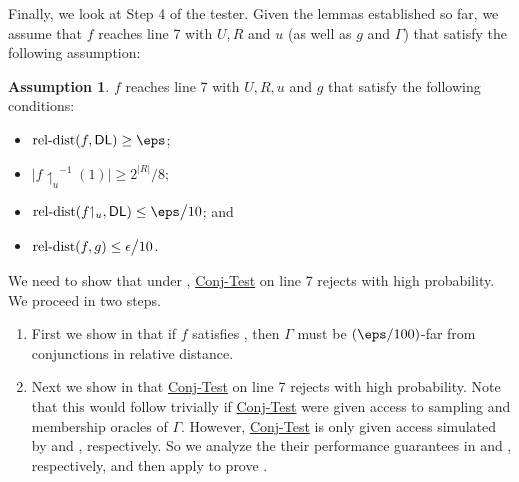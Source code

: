 \documentclass[11pt]{article}
\theoremstyle{definition}
\newtheorem{assumption}{Assumption}
\begin{document}
Finally, we look at Step 4 of the tester. 
Given the lemmas established so far, we assume that $f$ reaches line 7 with $U,R$ and $u$ (as well as $g$ and $\Gamma$) that satisfy the following assumption:

\begin{assumption}\label{assumption: fu dense + close to g}
$f$ reaches line 7 with $U,R,u$ and $g$ that satisfy the following conditions:
    \begin{itemize}
    \item $\reldist(f,\textsf{DL})\ge \eps$;
        \item $\big|f{\upharpoonleft_{ u}}^{-1}(1)\big| \geq 2^{| R|}\big/8 $;
        \item $\reldist(f{\upharpoonleft_{u}},\textsf{DL})\le \eps\big/10 $; and
        \item $\mathrm{rel}\text{-}\mathrm{dist}(f, g)\leq \epsilon\big/10$.
\end{itemize}
\end{assumption}

We need to show that under , 
\hyperlink{Algorithm2}{\sc Conj-Test} on line 7
  rejects with high probability. 
We proceed in two steps.
\begin{flushleft}\begin{enumerate}
\item First we show in  that if $f$ satisfies ,
  then $\Gamma$ must be $(\eps/100)$-far from conjunctions in
  relative distance. 
\item Next we show in  that \hyperlink{Algorithm2}{\sc Conj-Test} on line 7 rejects with high probability. Note that this would follow trivially if \hyperlink{Algorithm2}{\sc Conj-Test} were given access to sampling and membership oracles of $\Gamma$.
However, \hyperlink{Algorithm2}{\sc Conj-Test} is only given access simulated by  and ,
  respectively. 
So we analyze the their performance guarantees in 
  and , respectively, and then apply  to prove .
\end{enumerate}\end{flushleft}
\end{document}
